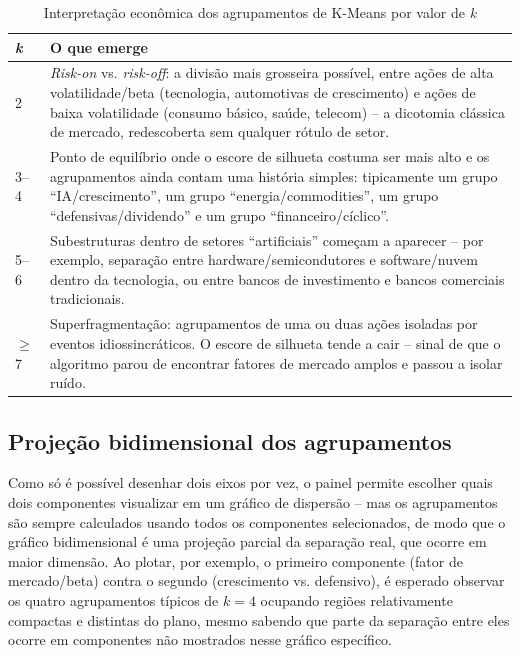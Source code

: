 \documentclass[12pt,oneside,a4paper,brazil,sumario=tradicional]{abntex2}
\begin{document}
\begin{table}[htb]
\caption{Interpretação econômica dos agrupamentos de K-Means por valor de \emph{k}}
\centering
\begin{tabular}{p{0.9cm}p{12.3cm}}
\toprule
\textbf{\emph{k}} & \textbf{O que emerge} \\
\midrule
2 & \emph{Risk-on} vs. \emph{risk-off}: a divisão mais grosseira possível, entre
ações de alta volatilidade/beta (tecnologia, automotivas de crescimento) e ações
de baixa volatilidade (consumo básico, saúde, telecom) -- a dicotomia clássica de
mercado, redescoberta sem qualquer rótulo de setor. \\
3--4 & Ponto de equilíbrio onde o escore de silhueta costuma ser mais alto e os
agrupamentos ainda contam uma história simples: tipicamente um grupo
``IA/crescimento'', um grupo ``energia/commodities'', um grupo
``defensivas/dividendo'' e um grupo ``financeiro/cíclico''. \\
5--6 & Subestruturas dentro de setores ``artificiais'' começam a aparecer -- por
exemplo, separação entre hardware/semicondutores e software/nuvem dentro da
tecnologia, ou entre bancos de investimento e bancos comerciais tradicionais. \\
$\geq$ 7 & Superfragmentação: agrupamentos de uma ou duas ações isoladas por
eventos idiossincráticos. O escore de silhueta tende a cair -- sinal de que o
algoritmo parou de encontrar fatores de mercado amplos e passou a isolar
ruído. \\
\bottomrule
\end{tabular}
\vspace{2mm}
\end{table}

\subsection{Projeção bidimensional dos agrupamentos}

Como só é possível desenhar dois eixos por vez, o painel permite escolher quais
dois componentes visualizar em um gráfico de dispersão -- mas os agrupamentos
são sempre calculados usando todos os componentes selecionados, de modo que o
gráfico bidimensional é uma projeção parcial da separação real, que ocorre em
maior dimensão. Ao plotar, por exemplo, o primeiro componente (fator de
mercado/beta) contra o segundo (crescimento vs. defensivo), é esperado observar
os quatro agrupamentos típicos de $k=4$ ocupando regiões relativamente
compactas e distintas do plano, mesmo sabendo que parte da separação entre eles
ocorre em componentes não mostrados nesse gráfico específico.
\end{document}
